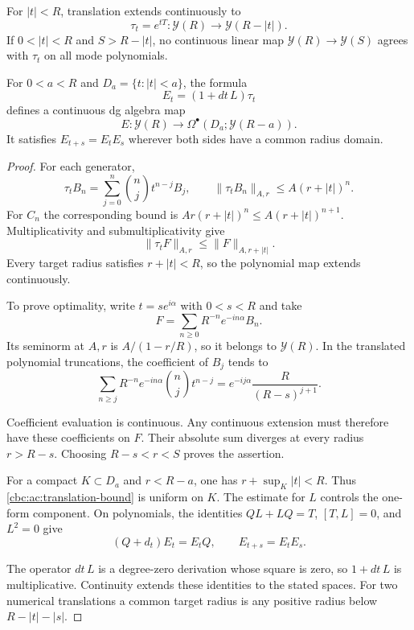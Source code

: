 \begin{theorem}
\label{cbc:ac:translation}
For $|t|<R$, translation extends continuously to
\[
 \tau_t=e^{tT}:\mathcal Y(R)\longrightarrow
                                      \mathcal Y(R-|t|).
\]
If $0<|t|<R$ and $S>R-|t|$, no continuous linear map
$\mathcal Y(R)\to\mathcal Y(S)$ agrees with $\tau_t$
on all mode polynomials.

For $0<a<R$ and $D_a=\{t:|t|<a\}$, the formula
\[
 E_t=(1+dt\,L)\tau_t
\]
defines a continuous dg algebra map
\[
 E:\mathcal Y(R)\longrightarrow
                         \Omega^\bullet(D_a;\mathcal Y(R-a)).
\]
It satisfies $E_{t+s}=E_tE_s$ wherever both sides have a
common radius domain.
\end{theorem}
\begin{proof}
For each generator,
\[
 \tau_tB_n=\sum_{j=0}^n\binom njt^{n-j}B_j,\qquad
 \|\tau_tB_n\|_{A,r}\leq A(r+|t|)^n.
\]
For $C_n$ the corresponding bound is
$Ar(r+|t|)^n\leq A(r+|t|)^{n+1}$.
Multiplicativity and submultiplicativity give
\begin{equation}\label{cbc:ac:translation-bound}
 \|\tau_tF\|_{A,r}\leq\|F\|_{A,r+|t|}.
\end{equation}
Every target radius satisfies $r+|t|<R$, so the
polynomial map extends continuously.

To prove optimality, write $t=s e^{i\alpha}$ with
$0<s<R$ and take
\[
 F=\sum_{n\geq0}R^{-n}e^{-in\alpha}B_n.
\]
Its seminorm at $A,r$ is $A/(1-r/R)$, so it belongs
to $\mathcal Y(R)$. In the translated polynomial
truncations, the coefficient of $B_j$ tends to
\[
 \sum_{n\geq j}R^{-n}e^{-in\alpha}\binom njt^{n-j}
       =e^{-ij\alpha}\frac{R}{(R-s)^{j+1}}.
\]

Coefficient evaluation is continuous. Any continuous
extension must therefore have these coefficients on $F$.
Their absolute sum diverges at every radius $r>R-s$.
Choosing $R-s<r<S$ proves the assertion.

For a compact $K\subset D_a$ and $r<R-a$, one has
$r+\sup_K|t|<R$. Thus \eqref{cbc:ac:translation-bound}
is uniform on $K$. The estimate for $L$ controls the
one-form component. On polynomials, the identities
$QL+LQ=T$, $[T,L]=0$, and $L^2=0$ give
\[
 (Q+d_t)E_t=E_tQ,\qquad E_{t+s}=E_tE_s.
\]

The operator $dt\,L$ is a degree-zero derivation whose
square is zero, so $1+dt\,L$ is multiplicative.
Continuity extends these identities to the stated spaces.
For two numerical translations a common target radius is
any positive radius below $R-|t|-|s|$.
\end{proof}

